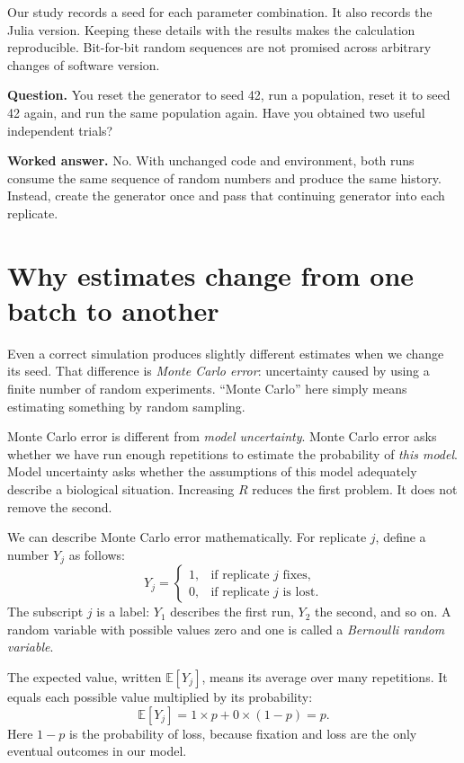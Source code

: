 Our study records a seed for each parameter combination. It also records the Julia version. Keeping these details with the results makes the calculation reproducible. Bit-for-bit random sequences are not promised across arbitrary changes of software version.

\begin{checkpoint}
\textbf{Question.} You reset the generator to seed 42, run a population, reset it to seed 42 again, and run the same population again. Have you obtained two useful independent trials?

\textbf{Worked answer.} No. With unchanged code and environment, both runs consume the same sequence of random numbers and produce the same history. Instead, create the generator once and pass that continuing generator into each replicate.
\end{checkpoint}

\section{Why estimates change from one batch to another}

Even a correct simulation produces slightly different estimates when we change its seed. That difference is \emph{Monte Carlo error}: uncertainty caused by using a finite number of random experiments. ``Monte Carlo'' here simply means estimating something by random sampling.

Monte Carlo error is different from \emph{model uncertainty}. Monte Carlo error asks whether we have run enough repetitions to estimate the probability of \emph{this model}. Model uncertainty asks whether the assumptions of this model adequately describe a biological situation. Increasing $R$ reduces the first problem. It does not remove the second.

We can describe Monte Carlo error mathematically. For replicate $j$, define a number $Y_j$ as follows:
\[
Y_j=
\begin{cases}
1,&\text{if replicate }j\text{ fixes},\\
0,&\text{if replicate }j\text{ is lost}.
\end{cases}
\]
The subscript $j$ is a label: $Y_1$ describes the first run, $Y_2$ the second, and so on. A random variable with possible values zero and one is called a \emph{Bernoulli random variable}.

The expected value, written $\mathbb E[Y_j]$, means its average over many repetitions. It equals each possible value multiplied by its probability:
\[
\mathbb E[Y_j]=1\times p+0\times(1-p)=p.
\]
Here $1-p$ is the probability of loss, because fixation and loss are the only eventual outcomes in our model.

